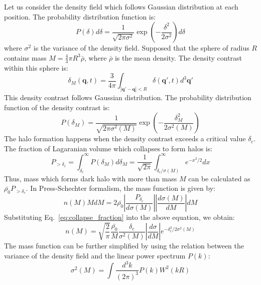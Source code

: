 Let us consider the density field which follows Gaussian distribution at each position. The probability distribution function is:
\begin{equation}
    P(\delta) d \delta=\frac{1}{\sqrt{2 \pi \sigma^2}} \exp \left(-\frac{\delta^2}{2 \sigma^2}\right) d \delta
\end{equation}
where $\sigma^2$ is the variance of the density field. Supposed that the sphere of radius $R$ contains mass $M = \frac{4}{3} \pi R^3 \bar{\rho}$, where $\bar{\rho}$ is the mean density. The density contrast within this sphere is:
\begin{equation}
    \delta_M(\boldsymbol{q}, t) = \frac{3}{4\pi} \int_{|\boldsymbol{q'}-\boldsymbol{q}|<R} \delta(\boldsymbol{q'}, t) d^3 \boldsymbol{q'}
\end{equation}
This density contrast follows Gaussian distribution. The probability distribution function of the density contrast is:
\begin{equation}
    P(\delta_M) = \frac{1}{\sqrt{2\pi \sigma^2(M)}} \exp \left(-\frac{\delta_M^2}{2\sigma^2(M)}\right)
\end{equation}
The halo formation happens when the density contrast exceeds a critical value $\delta_c$. The fraction of Lagaranian volume which collapses to form halos is:
\begin{equation}
    P_{>\delta_c} = \int_{\delta_c}^{\infty} P(\delta_M) d \delta_M = \frac{1}{\sqrt{2\pi}} \int_{\delta_c/\sigma(M)}^{\infty} e^{-x^2/2} dx
    \label{eq:collapse_fraction}
\end{equation}
Thus, mass which forms dark halo with more than mass $M$ can be calculated as $\bar{\rho_0} P_{>\delta_c}$. In Press-Schechter formalism, the mass function is given by:
\begin{equation}
    n(M) M dM = 2 \bar{\rho_0} \left|\frac{P_{\delta_c}}{d\sigma(M)}\right| \left|\frac{d\sigma(M)}{dM}\right| dM
\end{equation}
Substituting Eq.~\eqref{eq:collapse_fraction} into the above equation, we obtain:
\begin{equation}
    n(M) = \sqrt{\frac{2}{\pi}} \frac{\bar{\rho_0}}{M} \frac{\delta_c}{\sigma^2(M)} \left| \frac{d\sigma}{dM} \right| e^{-\delta_c^2/2\sigma^2(M)}
\end{equation}
The mass function can be further simplified by using the relation between the variance of the density field and the linear power spectrum $P(k)$:
\begin{equation}
    \sigma^2(M) = \int \frac{d^3 k}{(2\pi)^3} P(k) W^2(kR)
\end{equation}
